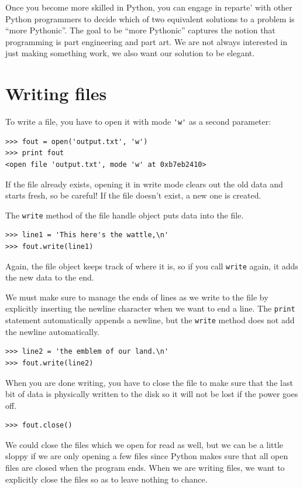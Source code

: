 \documentclass[10pt]{book}
\begin{document}
Once you become more skilled in Python, you can engage
in reparte' with other Python programmers to decide
which of two equivalent solutions to a problem is 
``more Pythonic''.  The goal to be ``more Pythonic'' 
captures the notion that programming is part engineering
and part art.  We are not always interested
in just making something work, we also want
our solution to be elegant.


\section{Writing files}


To write a file, you have to open it with mode
\verb"'w'" as a second parameter:

\beforeverb
\begin{verbatim}
>>> fout = open('output.txt', 'w')
>>> print fout
<open file 'output.txt', mode 'w' at 0xb7eb2410>
\end{verbatim}
\afterverb
%
If the file already exists, opening it in write mode clears out
the old data and starts fresh, so be careful!
If the file doesn't exist, a new one is created.

The {\tt write} method of the file handle object 
puts data into the file.

\beforeverb
\begin{verbatim}
>>> line1 = 'This here's the wattle,\n'
>>> fout.write(line1)
\end{verbatim}
\afterverb
%
Again, the file object keeps track of where it is, so if
you call {\tt write} again, it adds the new data to the end.

We must make sure to manage the ends of lines as we write
to the file by explicitly inserting the newline character
when we want to end a line.  The {\tt print} statement 
automatically appends a newline, but the {\tt write} 
method does not add the newline automatically.

\beforeverb
\begin{verbatim}
>>> line2 = 'the emblem of our land.\n'
>>> fout.write(line2)
\end{verbatim}
\afterverb
%
When you are done writing, you have to close the file
to make sure that the last bit of data is physically written
to the disk so it will not be lost if the power goes off.

\beforeverb
\begin{verbatim}
>>> fout.close()
\end{verbatim}
\afterverb
%
We could close the files which we open for read as well, 
but we can be a little sloppy if we are only opening a few
files since Python makes sure that all open files are 
closed when the program ends.  When we are writing files, 
we want to explicitly close the files so as to leave nothing
to chance.
\end{document}
